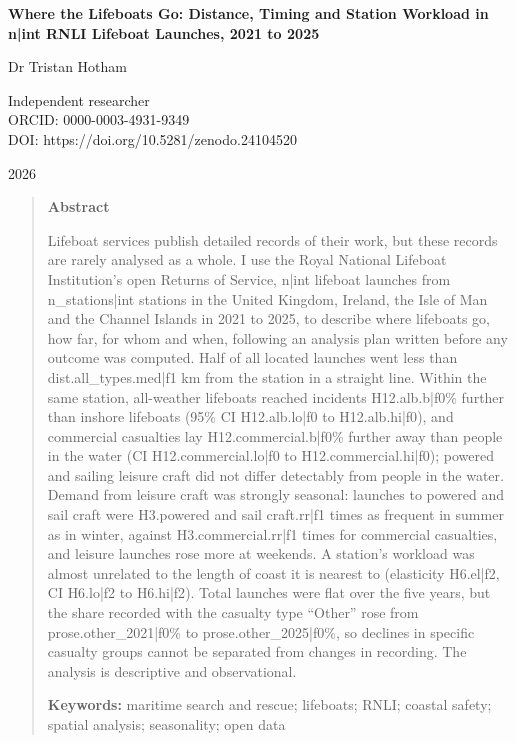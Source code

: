\documentclass[11pt,a4paper]{article}
\begin{document}
\begin{center}
{\Large\bfseries Where the Lifeboats Go: Distance, Timing and Station Workload in {{n|int}} RNLI Lifeboat Launches, 2021 to 2025\par}
\vspace{1.2em}
{\large Dr Tristan Hotham\par}
\vspace{0.3em}
{\small Independent researcher\\
ORCID: 0000-0003-4931-9349\\
DOI: https://doi.org/10.5281/zenodo.24104520\par}
\vspace{0.8em}
2026
\end{center}

\begin{quote}
\small
\begin{center}\textbf{Abstract}\end{center}
Lifeboat services publish detailed records of their work, but these records are rarely analysed as a whole. I use the Royal National Lifeboat Institution's open Returns of Service, {{n|int}} lifeboat launches from {{n_stations|int}} stations in the United Kingdom, Ireland, the Isle of Man and the Channel Islands in 2021 to 2025, to describe where lifeboats go, how far, for whom and when, following an analysis plan written before any outcome was computed. Half of all located launches went less than {{dist.all_types.med|f1}} km from the station in a straight line. Within the same station, all-weather lifeboats reached incidents {{H12.alb.b|f0}}\% further than inshore lifeboats (95\% CI {{H12.alb.lo|f0}} to {{H12.alb.hi|f0}}), and commercial casualties lay {{H12.commercial.b|f0}}\% further away than people in the water (CI {{H12.commercial.lo|f0}} to {{H12.commercial.hi|f0}}); powered and sailing leisure craft did not differ detectably from people in the water. Demand from leisure craft was strongly seasonal: launches to powered and sail craft were {{H3.powered and sail craft.rr|f1}} times as frequent in summer as in winter, against {{H3.commercial.rr|f1}} times for commercial casualties, and leisure launches rose more at weekends. A station's workload was almost unrelated to the length of coast it is nearest to (elasticity {{H6.el|f2}}, CI {{H6.lo|f2}} to {{H6.hi|f2}}). Total launches were flat over the five years, but the share recorded with the casualty type ``Other'' rose from {{prose.other_2021|f0}}\% to {{prose.other_2025|f0}}\%, so declines in specific casualty groups cannot be separated from changes in recording. The analysis is descriptive and observational.

\textbf{Keywords:} maritime search and rescue; lifeboats; RNLI; coastal safety; spatial analysis; seasonality; open data
\end{quote}
\end{document}
